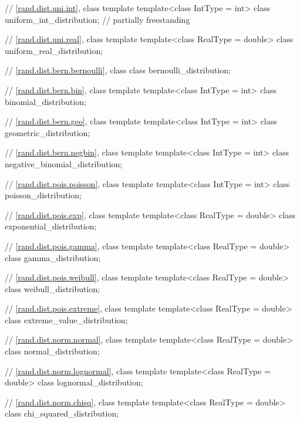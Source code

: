 \begin{codeblock}
{  // \ref{rand.dist.uni.int}, class template 
  template<class IntType = int>
    class uniform_int_distribution;                             // partially freestanding

  // \ref{rand.dist.uni.real}, class template 
  template<class RealType = double>
    class uniform_real_distribution;

  // \ref{rand.dist.bern.bernoulli}, class 
  class bernoulli_distribution;

  // \ref{rand.dist.bern.bin}, class template 
  template<class IntType = int>
    class binomial_distribution;

  // \ref{rand.dist.bern.geo}, class template 
  template<class IntType = int>
    class geometric_distribution;

  // \ref{rand.dist.bern.negbin}, class template 
  template<class IntType = int>
    class negative_binomial_distribution;

  // \ref{rand.dist.pois.poisson}, class template 
  template<class IntType = int>
    class poisson_distribution;

  // \ref{rand.dist.pois.exp}, class template 
  template<class RealType = double>
    class exponential_distribution;

  // \ref{rand.dist.pois.gamma}, class template 
  template<class RealType = double>
    class gamma_distribution;

  // \ref{rand.dist.pois.weibull}, class template 
  template<class RealType = double>
    class weibull_distribution;

  // \ref{rand.dist.pois.extreme}, class template 
  template<class RealType = double>
    class extreme_value_distribution;

  // \ref{rand.dist.norm.normal}, class template 
  template<class RealType = double>
    class normal_distribution;

  // \ref{rand.dist.norm.lognormal}, class template 
  template<class RealType = double>
    class lognormal_distribution;

  // \ref{rand.dist.norm.chisq}, class template 
  template<class RealType = double>
    class chi_squared_distribution;

}
\end{codeblock}
